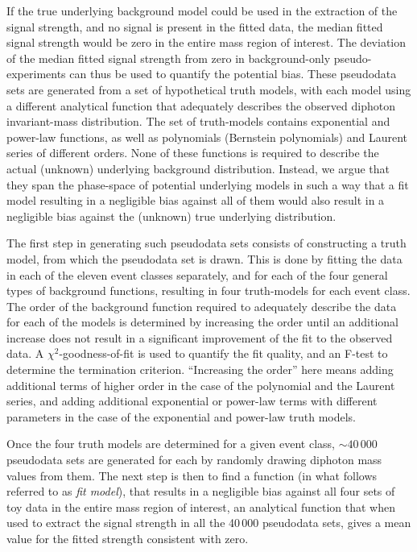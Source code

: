 \documentclass[11pt,twoside,a4paper,cmspaper,final,collab]{cms-tdr}
\begin{document}
If the true underlying background model could be used in the extraction of the signal strength,
and no signal is present in the fitted data, the median fitted signal strength would be zero in
the entire mass region of interest. The deviation of the median fitted signal strength from zero
in background-only pseudo-experiments can thus be used to quantify the potential bias.
These pseudodata sets
are generated from a set of hypothetical truth models, with each model using a different
analytical function that adequately describes the observed diphoton invariant-mass distribution.
The set of truth-models contains exponential and power-law functions,
as well as polynomials (Bernstein polynomials) and Laurent series of different orders.
None of these functions is required to describe the actual (unknown) underlying background distribution.
Instead, we argue that they span the phase-space of potential underlying
models in such a way that a fit model resulting in a negligible bias against all of them would also
result in a negligible bias against the (unknown) true underlying distribution.

The first step in generating such pseudodata sets consists of constructing a truth model, from which
the pseudodata set is drawn. This is done by fitting the data in each of the eleven event classes separately, and for each
of the four general types of background functions, resulting in four truth-models for each event class. The order
of the background function required to adequately describe the data for each of the models is determined
by increasing the order
until an additional increase does not result in a significant improvement of the fit to the
observed data. A $\chi^2$-goodness-of-fit is used to quantify the fit quality, and
an F-test to determine the termination criterion. ``Increasing the order'' here means adding additional
terms of higher order in the case of the polynomial and the Laurent series, and adding additional
exponential or power-law terms with different parameters in the case of the exponential and power-law
truth models.

Once the four truth models are determined for a given event class, ${\sim}40\,000$ pseudodata sets
are generated for each by randomly drawing diphoton mass values from them. The next step is then
to find a function (in what follows referred to as \emph{fit model}), that results in a negligible bias
against all four sets of toy data in the entire mass region of interest, \ie an analytical function that
when used to extract the signal strength in all the 40\,000  pseudodata sets, gives a mean value for the fitted strength
consistent with zero.
\end{document}
